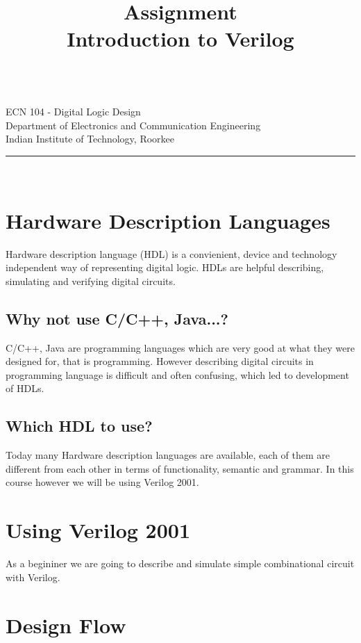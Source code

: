 \documentclass[a4paper,10pt]{article}
\makeatletter
\newcommand{\linia}{\rule{\linewidth}{0.5pt}}
\newcommand{\ano}{\text{1}}
\theoremstyle{mytheor}
\renewcommand{\maketitle}{
\begin{center}
\vspace{2ex}
{\huge \textsc{\@title}}
\vspace{1ex}
\\
ECN 104  - Digital Logic Design \\
Department of Electronics and Communication Engineering \\
Indian Institute of Technology, Roorkee
\linia\\
\@author \hfill \@date
\vspace{4ex}
\end{center}
}
\makeatother
\begin{document}
\title{Assignment \ano \\ Introduction to Verilog}

\maketitle

\section*{Hardware Description Languages}
Hardware description language (HDL) is a convienient, device and technology independent way of representing digital logic. HDLs are helpful describing, simulating and verifying digital circuits.

\subsection*{Why not use C/C++, Java...?} 
C/C++, Java are programming languages which are very good at what they were designed for, that is programming. However describing digital circuits in programming language is difficult and often confusing, which led to development of HDLs.

\subsection*{Which HDL to use?}
Today many Hardware description languages are available, each of them are different from each other in terms of functionality, semantic and grammar. In this course however we will be using Verilog  2001.

\section*{Using Verilog 2001}
As a begininer we are going to describe and simulate simple combinational circuit with Verilog.

\section*{Design Flow}  
\end{document}

